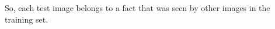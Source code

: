 \documentclass[runningheads]{llncs}
\begin{document}
So, each test image belongs to a fact that was seen by other images in the training set. %
\end{document}
